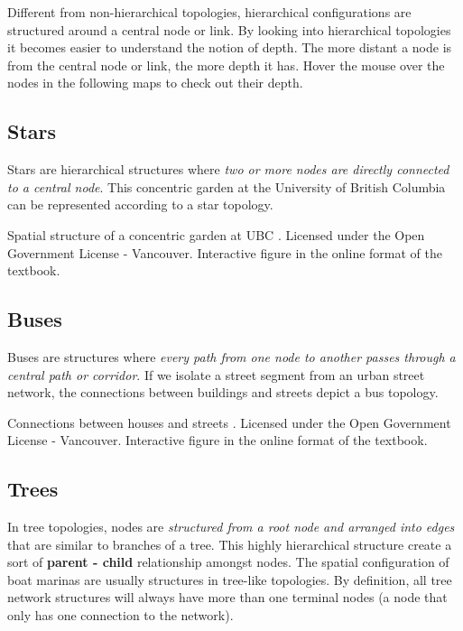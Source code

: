 \documentclass[
]{book}
\begin{document}
Different from non-hierarchical topologies, hierarchical configurations are structured around a central node or link.
By looking into hierarchical topologies it becomes easier to understand the notion of depth. The more distant a node is from the central node or link, the more depth it has. Hover the mouse over the nodes in the following maps to check out their depth.

\hypertarget{stars}{%
\subsection{Stars}\label{stars}}

Stars are hierarchical structures where \emph{two or more nodes are directly connected to a central node}. This concentric garden at the University of British Columbia can be represented according to a star topology.

\label{fig:8-spatial-structure-garden}Spatial structure of a concentric garden at UBC \citep{city_of_vancouver_open_nodate}. Licensed under the Open Government License - Vancouver. Interactive figure in the online format of the textbook.

\hypertarget{buses}{%
\subsection{Buses}\label{buses}}

Buses are structures where \emph{every path from one node to another passes through a central path or corridor}. If we isolate a street segment from an urban street network, the connections between buildings and streets depict a bus topology.

\label{fig:8-connections-houses-streets}Connections between houses and streets \citep{city_of_vancouver_open_nodate}. Licensed under the Open Government License - Vancouver. Interactive figure in the online format of the textbook.

\hypertarget{trees}{%
\subsection{Trees}\label{trees}}

In tree topologies, nodes are \emph{structured from a root node and arranged into edges} that are similar to branches of a tree. This highly hierarchical structure create a sort of \textbf{parent - child} relationship amongst nodes. The spatial configuration of boat marinas are usually structures in tree-like topologies. By definition, all tree network structures will always have more than one terminal nodes (a node that only has one connection to the network).
\end{document}
